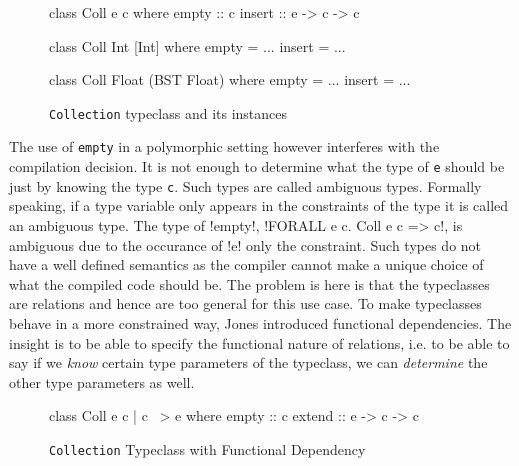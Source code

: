 \documentclass[manuscript,screen,nonacm]{acmart}
\begin{document}
\begin{figure}[ht]
  \centering
  \begin{minipage}[ht]{0.3\linewidth}
    \begin{code}
      class Coll e c
      where
         empty :: c
         insert :: e -> c -> c
    \end{code}
  \end{minipage}%
  \begin{minipage}[ht]{0.3\linewidth}
    \begin{code}
      class Coll Int [Int]
      where
         empty = ...
         insert = ...
    \end{code}
  \end{minipage}%
  \begin{minipage}[ht]{0.3\linewidth}
    \begin{code}
      class Coll Float (BST Float)
      where
         empty = ...
         insert = ...
    \end{code}
  \end{minipage}
  \caption[Collection typeclass]{\lstinline{Collection} typeclass and its instances}
  \label{fig:tc-collection}
\end{figure}

The use of \lstinline{empty} in a polymorphic setting however interferes with the compilation decision. It is not enough to determine what the type of \lstinline{e} should be just by knowing the type \lstinline{c}. Such types are called ambiguous types. Formally speaking, if a type variable only appears in the constraints of the type it is called an ambiguous type. The type of !empty!, !FORALL e c. Coll e c => c!, is ambiguous due to the occurance of !e! only the constraint. Such types do not have a well defined semantics as the compiler cannot make a unique choice of what the compiled code should be. The problem is here is that the typeclasses are relations and hence are too general for this use case. To make typeclasses behave in a more constrained way, Jones introduced functional dependencies\cite{jones_tcfd_2000}. The insight is to be able to specify the functional nature of relations, i.e. to be able to say if we \emph{know} certain type parameters of the typeclass, we can \emph{determine} the other type parameters as well.

\begin{figure}[ht]
  \begin{center}
    \begin{code}
      class Coll e c | c ~> e where
          empty :: c
          extend :: e -> c -> c
    \end{code}
  \end{center}
  \caption[Collection typeclass]{\lstinline{Collection} Typeclass with Functional Dependency}
  \label{fig:tc-collection-fd}
\end{figure}
\end{document}
